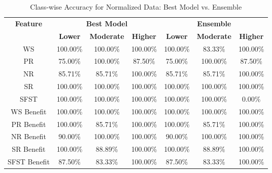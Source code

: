 \begin{table}[H]
\centering
\begin{tabular}{|c|c|c|c|c|c|c|}
\hline
\multirow{2}{*}{\textbf{Feature}} & \multicolumn{3}{c|}{\textbf{Best Model}} & \multicolumn{3}{c|}{\textbf{Ensemble}} \\
\cline{2-7}
 & \textbf{Lower} & \textbf{Moderate} & \textbf{Higher} & \textbf{Lower} & \textbf{Moderate} & \textbf{Higher} \\
\hline
WS & 100.00\% & 100.00\% & 100.00\% & 100.00\% & 83.33\% & 100.00\% \\
\hline
PR & 75.00\% & 100.00\% & 87.50\% & 75.00\% & 100.00\% & 87.50\% \\
\hline
NR & 85.71\% & 85.71\% & 100.00\% & 85.71\% & 85.71\% & 100.00\% \\
\hline
SR & 100.00\% & 100.00\% & 100.00\% & 100.00\% & 100.00\% & 100.00\% \\
\hline
SFST & 100.00\% & 100.00\% & 100.00\% & 100.00\% & 100.00\% & 0.00\% \\
\hline
WS Benefit & 100.00\% & 100.00\% & 100.00\% & 100.00\% & 100.00\% & 100.00\% \\
\hline
PR Benefit & 100.00\% & 85.71\% & 100.00\% & 100.00\% & 85.71\% & 100.00\% \\
\hline
NR Benefit & 90.00\% & 100.00\% & 100.00\% & 90.00\% & 100.00\% & 100.00\% \\
\hline
SR Benefit & 100.00\% & 88.89\% & 100.00\% & 100.00\% & 88.89\% & 100.00\% \\
\hline
SFST Benefit & 87.50\% & 83.33\% & 100.00\% & 87.50\% & 83.33\% & 100.00\% \\
\hline
\end{tabular}
\caption{Class-wise Accuracy for Normalized Data: Best Model vs. Ensemble}
\label{reg_all_tab:grouping_norm_accuracy}
\end{table}

